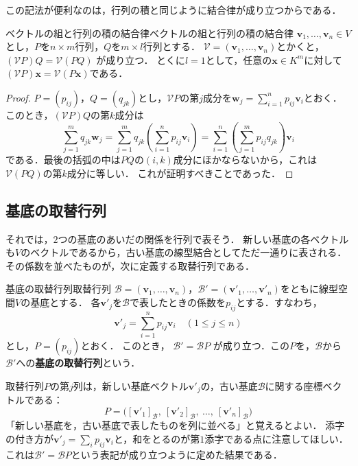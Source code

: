 この記法が便利なのは，行列の積と同じように結合律が成り立つからである．

\begin{prop}{ベクトルの組と行列の積の結合律}{ベクトルの組と行列の積の結合律}
  $\bm{v}_1, \dots, \bm{v}_n \in V$とし，$P$を$n \times m$行列，$Q$を$m \times l$行列とする．
  $\mathcal{V} = (\bm{v}_1, \dots, \bm{v}_n)$とかくと，
  $(\mathcal{V} P) Q = \mathcal{V} (PQ)$
  が成り立つ．
  とくに$l=1$として，任意の$\bm{x}\in K^m$に対して$(\mathcal{V}P)\bm{x}=\mathcal{V}(P\bm{x})$である．
\end{prop}

\begin{tleftbar}
\begin{proof}
  $P = (p_{ij})$，$Q = (q_{jk})$とし，$\mathcal{V}P$の第$j$成分を$\bm{w}_j = \sum_{i=1}^{n} p_{ij} \bm{v}_i$とおく．
  このとき，$(\mathcal{V}P)Q$の第$k$成分は
  \[
    \sum_{j=1}^{m} q_{jk} \bm{w}_j
    = \sum_{j=1}^{m} q_{jk} \left( \sum_{i=1}^{n} p_{ij} \bm{v}_i \right)
    = \sum_{i=1}^{n} \left( \sum_{j=1}^{m} p_{ij} q_{jk} \right) \bm{v}_i
  \]
  である．最後の括弧の中は$PQ$の$(i,k)$成分にほかならないから，これは$\mathcal{V}(PQ)$の第$k$成分に等しい．
  これが証明すべきことであった．
\end{proof}
\end{tleftbar}

\subsection{基底の取替行列}

それでは，$2$つの基底のあいだの関係を行列で表そう．
新しい基底の各ベクトルも$V$のベクトルであるから，古い基底の線型結合としてただ一通りに表される．
その係数を並べたものが，次に定義する取替行列である．

\begin{definition}{基底の取替行列}{取替行列}
  $\mathcal{B} = (\bm{v}_1, \dots, \bm{v}_n)$，$\mathcal{B}' = (\bm{v}'_1, \dots, \bm{v}'_n)$をともに線型空間$V$の基底とする．
  各$\bm{v}'_j$を$\mathcal{B}$で表したときの係数を$p_{ij}$とする．すなわち，
  \[
    \bm{v}'_j = \sum_{i=1}^{n} p_{ij} \bm{v}_i \quad (1 \le j \le n)
  \]
  とし，$P = (p_{ij})$とおく．
  このとき，
  $\mathcal{B}' = \mathcal{B} P$
  が成り立つ．この$P$を，$\mathcal{B}$から$\mathcal{B}'$への\textbf{基底の取替行列}という．
\end{definition}

\begin{remark}[取替行列の列の意味]
  取替行列$P$の第$j$列は，新しい基底ベクトル$\bm{v}'_j$の，古い基底$\mathcal{B}$に関する座標ベクトルである：
  \[
    P = \bigl( [\bm{v}'_1]_{\mathcal{B}},~ [\bm{v}'_2]_{\mathcal{B}},~ \dots,~ [\bm{v}'_n]_{\mathcal{B}} \bigr)
  \]
  「新しい基底を，古い基底で表したものを列に並べる」と覚えるとよい．
  添字の付き方が$\bm{v}'_j = \sum_i p_{ij} \bm{v}_i$と，和をとるのが第$1$添字である点に注意してほしい．
  これは$\mathcal{B}' = \mathcal{B}P$という表記が成り立つように定めた結果である．
\end{remark}

